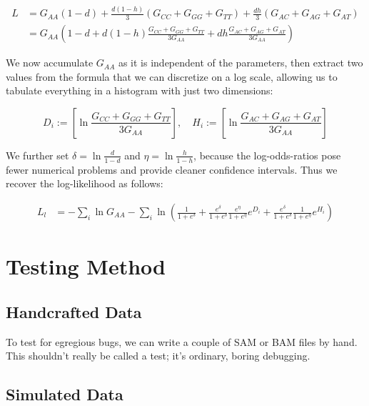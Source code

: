 \documentclass{article}
\begin{document}
\begin{align*}
L &= G_{AA} \left( 1-d \right) + \frac{d(1-h)}{3} \left( G_{CC} + G_{GG} + G_{TT} \right)
          + \frac{dh}{3} \left( G_{AC} + G_{AG} + G_{AT} \right) \\
  &= G_{AA} \left( 1-d + d(1-h) \frac{G_{CC} + G_{GG} + G_{TT}}{3 G_{AA}}
          + dh \frac{G_{AC} + G_{AG} + G_{AT}}{3 G_{AA}} \right)
\end{align*}

We now accumulate $G_{AA}$ as it is independent of the
parameters, then extract two values from the formula that we can
discretize on a log scale, allowing us to tabulate everything in a
histogram with just two dimensions:

\begin{equation*}
D_i := \left[ \ln \frac{G_{CC} + G_{GG} + G_{TT}}{3 G_{AA}} \right], \quad
H_i := \left[ \ln \frac{G_{AC} + G_{AG} + G_{AT}}{3 G_{AA}} \right]
\end{equation*}

We further set $\delta = \ln \frac{d}{1-d}$ and $\eta = \ln
\frac{h}{1-h}$, because the log-odds-ratios pose fewer numerical
problems and provide cleaner confidence intervals.  Thus we recover the
log-likelihood as follows:

\begin{align*}
L_l &= - \sum_{i} \ln G_{AA} - \sum_{i} \ln \left( \frac{1}{1+e^\delta} +
    \frac{e^\delta}{1+e^\delta} \frac{e^\eta}{1+e^\eta} e^{D_i} +
    \frac{e^\delta}{1+e^\delta} \frac{1}{1+e^\eta} e^{H_i} \right)
\end{align*}


\section{Testing Method}

\subsection{Handcrafted Data}

To test for egregious bugs, we can write a couple of SAM or BAM files by
hand.  This shouldn't really be called a test; it's ordinary, boring
debugging.

\subsection{Simulated Data}
\end{document}
